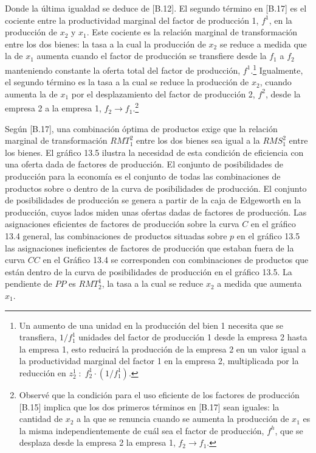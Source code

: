 \documentclass[10pt,a4paper]{article}
\begin{document}
Donde la última igualdad se deduce de [B.12]. El segundo término en [B.17] es el cociente entre la productividad marginal del factor de producción 1, $f^1$, en la producción de $x_2$ y $x_1$. Este cociente es la relación marginal de transformación entre los dos bienes: la tasa a la cual la producción de $x_2$ se reduce a medida que la de $x_1$ aumenta cuando el factor de producción se transfiere desde la $f_1$ a $f_2$ manteniendo constante la oferta total del factor de producción, $f^1$.\footnote{%
    Un aumento de una unidad en la producción del bien 1 necesita que se transfiera, $1/f_1^1$ unidades del factor de producción 1 desde la empresa 2 hasta la empresa 1, esto reducirá la producción de la empresa 2 en un valor igual a la productividad marginal del factor 1 en la empresa 2, multiplicada por la reducción en $z_2^1\;:\; f_2^1\cdot(1/f_1^1)$.
}  Igualmente, el segundo término es la tasa a la cual se reduce la producción de $x_2$, cuando aumenta la de $x_1$ por el desplazamiento del factor de producción 2, $f^2$, desde la empresa 2 a la empresa 1, $f_2\to f_1$.\footnote{%
    Observé que la condición para el uso eficiente de los factores de producción [B.15] implica que los dos primeros términos en [B.17] sean iguales: la cantidad de $x_2$ a la que se renuncia cuando se aumenta la producción de $x_1$ es la misma independientemente de cuál sea el factor de producción, $f^h$, que se desplaza desde la empresa 2 la empresa 1, $f_2\to f_1$.
} 

Según [B.17], una combinación óptima de productos exige que la relación marginal de transformación $RMT_1^2$ entre los dos bienes sea igual a la $RMS_1^2$ entre los bienes. El gráfico 13.5 ilustra la necesidad de esta condición de eficiencia con una oferta dada de factores de producción. El conjunto de posibilidades de producción para la economía es el conjunto de todas las combinaciones de productos sobre o dentro de la curva de posibilidades de producción. El conjunto de posibilidades de producción se genera a partir de la caja de Edgeworth en la producción, cuyos lados miden unas ofertas dadas de factores de producción. Las asignaciones eficientes de factores de producción sobre la curva $C$ en el gráfico 13.4 general, las combinaciones de productos situadas sobre $p$ en el gráfico 13.5 las asignaciones ineficientes de factores de producción que estaban fuera de la curva $CC$ en el Gráfico 13.4 se corresponden con combinaciones de productos que están dentro de la curva de posibilidades de producción en el gráfico 13.5. La pendiente de $PP$ es $RMT_2^1$, la tasa a la cual se reduce $x_2$ a medida que aumenta $x_1$.
\end{document}
